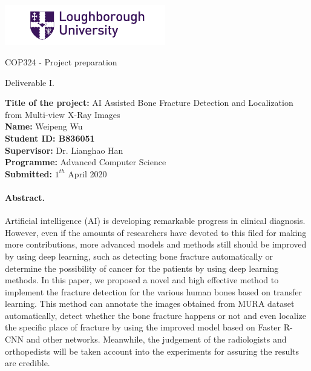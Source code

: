 \documentclass[12pt,oneside,a4paper]{article}
\newcommand*{\makeTitleParagraph}{
\begingroup
\begin{center}
\includegraphics[width = 7cm]{LoughboroughLogo.png} \par
COP324 - Project preparation\par
Deliverable I. \par
\end{center}

 
\noindent


\noindent
\textbf{Title of the project:} AI Assisted Bone Fracture Detection and Localization from Multi-view X-Ray Images\\ 
\textbf{Name:} Weipeng Wu\\
\textbf{Student ID: B836051}\\
\textbf{Supervisor:} Dr. Lianghao Han\\
\textbf{Programme:} Advanced Computer Science\\
\textbf{Submitted:} $1^{th}$ April 2020\\
\endgroup}
\begin{document}
\makeTitleParagraph %

\paragraph{Abstract.} Artificial intelligence (AI) is developing remarkable progress in clinical diagnosis. However, even if the amounts of researchers have devoted to this filed for making more contributions, more advanced models and methods still should be improved by using deep learning, such as detecting bone fracture automatically or determine the possibility of cancer for the patients by using deep learning methods. In this paper, we proposed a novel and high effective method to implement the fracture detection for the various human bones based on transfer learning. This method can annotate the images obtained from MURA dataset automatically, detect whether the bone fracture happens or not and even localize the specific place of fracture by using the improved model based on Faster R-CNN and other networks. Meanwhile, the judgement of the radiologists and orthopedists will be taken account into the experiments for assuring the results are credible.
\end{document}
